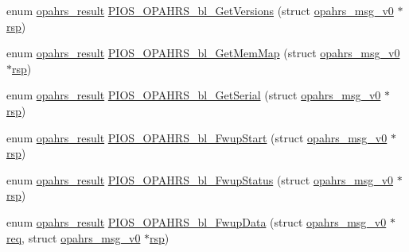 \begin{DoxyCompactItemize}
\item 
enum \hyperlink{group___p_i_o_s___o_p_a_h_r_s_gaf6fe64d28ea92983e870494d0a5d05bd}{opahrs\-\_\-result} \hyperlink{group___p_i_o_s___o_p_a_h_r_s_gab77141d03bc5b17886bec2bb4fcec3a7}{P\-I\-O\-S\-\_\-\-O\-P\-A\-H\-R\-S\-\_\-bl\-\_\-\-Get\-Versions} (struct \hyperlink{structopahrs__msg__v0}{opahrs\-\_\-msg\-\_\-v0} $\ast$\hyperlink{pios__opahrs__proto_8h_a33704cbdda2899ee80b99a109f814568}{rsp})
\item 
enum \hyperlink{group___p_i_o_s___o_p_a_h_r_s_gaf6fe64d28ea92983e870494d0a5d05bd}{opahrs\-\_\-result} \hyperlink{group___p_i_o_s___o_p_a_h_r_s_gad30305563d8e9e2ecb8bacaf203f17a3}{P\-I\-O\-S\-\_\-\-O\-P\-A\-H\-R\-S\-\_\-bl\-\_\-\-Get\-Mem\-Map} (struct \hyperlink{structopahrs__msg__v0}{opahrs\-\_\-msg\-\_\-v0} $\ast$\hyperlink{pios__opahrs__proto_8h_a33704cbdda2899ee80b99a109f814568}{rsp})
\item 
enum \hyperlink{group___p_i_o_s___o_p_a_h_r_s_gaf6fe64d28ea92983e870494d0a5d05bd}{opahrs\-\_\-result} \hyperlink{group___p_i_o_s___o_p_a_h_r_s_ga43649afa78f6c8bacb299cbd8c7b000f}{P\-I\-O\-S\-\_\-\-O\-P\-A\-H\-R\-S\-\_\-bl\-\_\-\-Get\-Serial} (struct \hyperlink{structopahrs__msg__v0}{opahrs\-\_\-msg\-\_\-v0} $\ast$\hyperlink{pios__opahrs__proto_8h_a33704cbdda2899ee80b99a109f814568}{rsp})
\item 
enum \hyperlink{group___p_i_o_s___o_p_a_h_r_s_gaf6fe64d28ea92983e870494d0a5d05bd}{opahrs\-\_\-result} \hyperlink{group___p_i_o_s___o_p_a_h_r_s_gabf88838c097eb514d070f373c2dcd063}{P\-I\-O\-S\-\_\-\-O\-P\-A\-H\-R\-S\-\_\-bl\-\_\-\-Fwup\-Start} (struct \hyperlink{structopahrs__msg__v0}{opahrs\-\_\-msg\-\_\-v0} $\ast$\hyperlink{pios__opahrs__proto_8h_a33704cbdda2899ee80b99a109f814568}{rsp})
\item 
enum \hyperlink{group___p_i_o_s___o_p_a_h_r_s_gaf6fe64d28ea92983e870494d0a5d05bd}{opahrs\-\_\-result} \hyperlink{group___p_i_o_s___o_p_a_h_r_s_gaa87845021b5151fe9462ea3bc6c3b826}{P\-I\-O\-S\-\_\-\-O\-P\-A\-H\-R\-S\-\_\-bl\-\_\-\-Fwup\-Status} (struct \hyperlink{structopahrs__msg__v0}{opahrs\-\_\-msg\-\_\-v0} $\ast$\hyperlink{pios__opahrs__proto_8h_a33704cbdda2899ee80b99a109f814568}{rsp})
\item 
enum \hyperlink{group___p_i_o_s___o_p_a_h_r_s_gaf6fe64d28ea92983e870494d0a5d05bd}{opahrs\-\_\-result} \hyperlink{group___p_i_o_s___o_p_a_h_r_s_ga658babb3f11ce146f013c2de54adc4be}{P\-I\-O\-S\-\_\-\-O\-P\-A\-H\-R\-S\-\_\-bl\-\_\-\-Fwup\-Data} (struct \hyperlink{structopahrs__msg__v0}{opahrs\-\_\-msg\-\_\-v0} $\ast$\hyperlink{pios__opahrs__proto_8h_ad651fd9affe5ed0ac9abccd8e2791a2c}{req}, struct \hyperlink{structopahrs__msg__v0}{opahrs\-\_\-msg\-\_\-v0} $\ast$\hyperlink{pios__opahrs__proto_8h_a33704cbdda2899ee80b99a109f814568}{rsp})

\end{DoxyCompactItemize}
